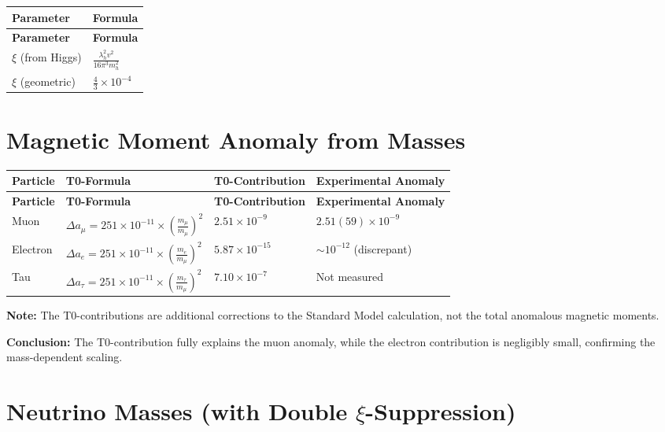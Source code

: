 \documentclass[12pt,a4paper]{article}
\begin{document}
	\begin{longtable}{|p{3cm}|p{5cm}|}
		\hline
		\textbf{Parameter} & \textbf{Formula} \\
		\hline
		\endfirsthead
		\hline
		\textbf{Parameter} & \textbf{Formula} \\
		\hline
		\endhead
		\(\xi\) (from Higgs) & \(\frac{\lambda_h^{2}v^{2}}{16\pi^{3}m_h^{2}}\) \\
		\hline
		\(\xi\) (geometric) & \(\frac{4}{3} \times 10^{-4}\) \\
		\hline
	\end{longtable}
	
\section{Magnetic Moment Anomaly from Masses}

\begin{longtable}{|p{2.5cm}|p{4.5cm}|p{4cm}|p{3cm}|}
	\hline
	\textbf{Particle} & \textbf{T0-Formula} & \textbf{T0-Contribution} & \textbf{Experimental Anomaly} \\
	\hline
	\endfirsthead
	\hline
	\textbf{Particle} & \textbf{T0-Formula} & \textbf{T0-Contribution} & \textbf{Experimental Anomaly} \\
	\hline
	\endhead
	
	Muon & $\Delta a_{\mu} = 251 \times 10^{-11} \times \left(\frac{m_{\mu}}{m_{\mu}}\right)^{2}$ & $2.51 \times 10^{-9}$ & $2.51(59) \times 10^{-9}$ \\
	\hline
	
	Electron & $\Delta a_{e} = 251 \times 10^{-11} \times \left(\frac{m_{e}}{m_{\mu}}\right)^{2}$ & $5.87 \times 10^{-15}$ & $\sim 10^{-12}$ (discrepant) \\
	\hline
	
	Tau & $\Delta a_{\tau} = 251 \times 10^{-11} \times \left(\frac{m_{\tau}}{m_{\mu}}\right)^{2}$ & $7.10 \times 10^{-7}$ & Not measured \\
	\hline
\end{longtable}

\textbf{Note:} The T0-contributions are additional corrections to the Standard Model calculation, not the total anomalous magnetic moments.

\textbf{Conclusion:} The T0-contribution fully explains the muon anomaly, while the electron contribution is negligibly small, confirming the mass-dependent scaling.
	
	\section{Neutrino Masses (with Double \(\xi\)-Suppression)}
	
\end{document}
